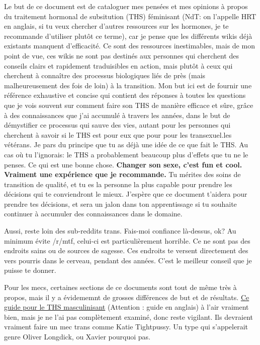 \documentclass{article}
\begin{document}
Le but de ce document est de cataloguer mes pensées et mes opinions à propos du traitement hormonal de subsitution (THS) féminisant (NdT: on l'appelle HRT en anglais, si tu veux chercher d'autres ressources sur les hormones, je te recommande d'utiliser plutôt ce terme), car je pense que les différents wikis déjà existants manquent d'efficacité. Ce sont des ressources inestimables, mais de mon point de vue, ces wikis ne sont pas destinés aux personnes qui cherchent des conseils clairs et rapidement traduisibles en action, mais plutôt à ceux qui cherchent à connaître des processus biologiques liés de près (mais malheureusement des fois de loin) à la transition. Mon but ici est de fournir une référence exhaustive et concise qui contient des réponses à toutes les questions que je vois souvent sur comment faire son THS de manière efficace et sûre, grâce à des connaissances que j'ai accumulé à travers les années, dans le but de démystifier ce processus qui sauve des vies, autant pour les personnes qui cherchent à savoir si le THS est pour eux que pour pour les transexuel.les vétérans. Je pars du principe que tu as déjà une idée de ce que fait le THS. Au cas où tu l'ignorais: le THS a probablement beaucoup plus d'effets que tu ne le penses. Ce qui est une bonne chose. \textbf{Changer son sexe, c'est fun et cool. Vraiment une expérience que je recommande.} Tu mérites des soins de transition de qualité, et tu es la personne la plus capable pour prendre les décisions qui te conviendront le mieux. J'espère que ce document t'aidera pour prendre tes décisions, et sera un jalon dans ton apprentissage si tu souhaite continuer à accumuler des connaissances dans le domaine.

Aussi, reste loin des sub-reddits trans. Fais-moi confiance là-dessus, ok? Au minimum évite /r/mtf, celui-ci est particulièrement horrible. Ce ne sont pas des endroits sains ou de sources de sagesse. Ces endroits te versent directement des vers pourris dans le cerveau, pendant des années. C'est le meilleur conseil que je puisse te donner.

Pour les mecs, certaines sections de ce documents sont tout de même très à propos, mais il y a évidememnt de grosses différences de but et de résultats. \href{https://mega.nz/folder/cfwSmBbY#ify6kaueB8SdDD1v12t2Dw}{Ce guide pour le THS masculinisant} (Attention : guide en anglais) à l'air vraiment bien, mais je ne l'ai pas complètement examiné, donc reste vigilant. Ils devraient vraiment faire un mec trans comme Katie Tightpussy. Un type qui s'appelerait genre Oliver Longdick, ou Xavier pourquoi pas.
\end{document}
